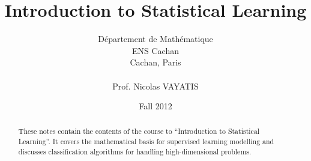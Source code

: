 \documentclass[notitlepage]{report}   %
\begin{document}
	\title{Introduction to Statistical Learning}  

	\author{
      {D\'{e}partement de Math\'{e}matique}\\
		{ENS Cachan}\\
		{Cachan, Paris}\\
		\\
		Prof. Nicolas VAYATIS
	}
	\date{Fall 2012}  
	\maketitle

	\begin{abstract}
      These notes contain the contents of the course to ``Introduction to Statistical Learning''. It covers the mathematical basis for supervised learning modelling and discusses classification algorithms for handling high-dimensional problems.

	\end{abstract}

	\tableofcontents

	
	
	
	
	

	


	
	
\end{document}
